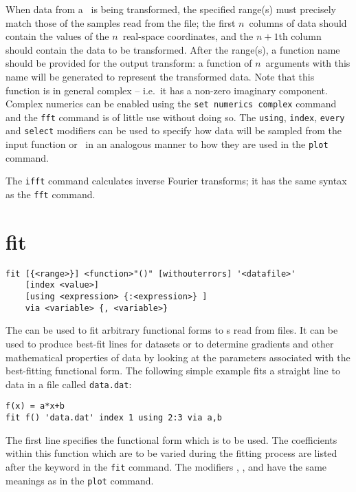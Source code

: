 When data from a \datafile\ is being transformed, the specified range(s) must
precisely match those of the samples read from the file; the first $n$~columns
of data should contain the values of the $n$~real-space coordinates, and the
$n+1$th column should contain the data to be transformed.  After the range(s),
a function name should be provided for the output transform: a function of
$n$~arguments with this name will be generated to represent the transformed
data.  Note that this function is in general complex -- i.e.\ it has a non-zero
imaginary component. Complex numerics can be enabled using the {\tt set
numerics complex} command and the {\tt fft} command is of little use without
doing so. The {\tt using}, {\tt index}, {\tt every} and {\tt select} modifiers
can be used to specify how data will be sampled from the input function or
\datafile\ in an analogous manner to how they are used in the {\tt plot}
command.

The {\tt ifft} command calculates inverse Fourier transforms; it has the same
syntax as the {\tt fft} command.

\section{fit}

\begin{verbatim}
fit [{<range>}] <function>"()" [withouterrors] '<datafile>'
    [index <value>]
    [using <expression> {:<expression>} ]
    via <variable> {, <variable>}
\end{verbatim}

The  can be used to fit arbitrary functional forms to \datapoint s
read from files. It can be used to produce best-fit lines for datasets or to
determine gradients and other mathematical properties of data by looking at the
parameters associated with the best-fitting functional form.  The following
simple example fits a straight line to data in a file called {\tt data.dat}:

\begin{verbatim}
f(x) = a*x+b
fit f() 'data.dat' index 1 using 2:3 via a,b
\end{verbatim}

\noindent The first line specifies the functional form which is to be used.
The coefficients within this function which are to be varied during the fitting
process are listed after the keyword  in the {\tt fit} command.
The modifiers , ,  and
 have the same meanings as in the {\tt plot} command.

